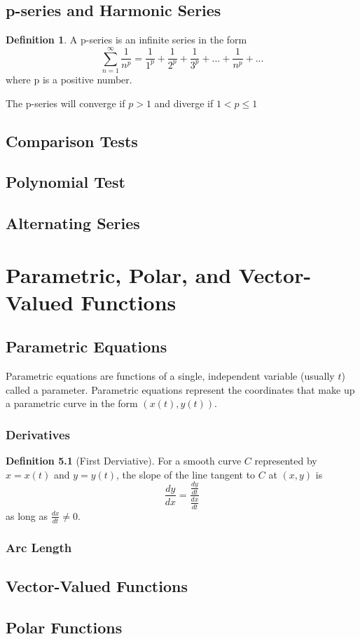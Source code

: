 \documentclass[letterpaper]{report}
\theoremstyle{definition}
\newtheorem{definition}{Definition}
\begin{document}
\section{p-series and Harmonic Series}
\begin{definition}
A p-series is an infinite series in the form
\[ \sum_{n=1}^\infty \frac{1}{n^p}=\frac{1}{1^p}+\frac{1}{2^p}
    +\frac{1}{3^p}+...+\frac{1}{n^p}+... \]
where p is a positive number.
\end{definition}
The p-series will converge if $p>1$ and diverge if $1<p\leq1$
\section{Comparison Tests}
\section{Polynomial Test}
\section{Alternating Series}

\chapter{Parametric, Polar, and Vector-Valued Functions}
\section{Parametric Equations}
Parametric equations are functions of a single, independent variable 
(usually $t$) called a parameter.
Parametric equations represent the coordinates that make up a parametric curve
in the form $(x(t), y(t))$.
\subsection{Derivatives}
\begin{definition}[First Derviative]
    For a smooth curve $C$ represented by $x = x(t)$ and $y = y(t)$,
    the slope of the line tangent to $C$ at $(x,y)$ is
\[ \frac{dy}{dx} = \frac{\frac{dy}{dt}}{\frac{dx}{dt}} \]
as long as $\frac{dx}{dt} \neq 0$. 
\end{definition}
\subsection{Arc Length}
\section{Vector-Valued Functions}
\section{Polar Functions}
\end{document}
